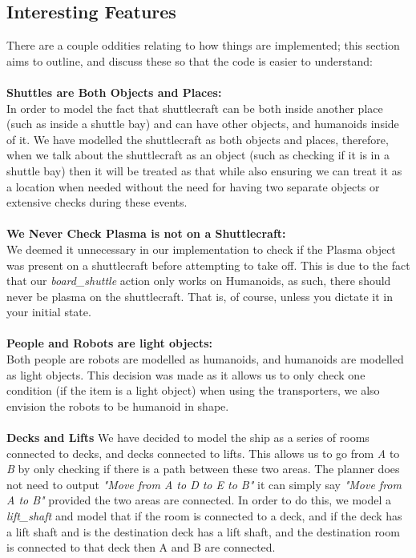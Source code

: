 \documentclass[11pt, oneside]{article}   	%
\begin{document}
\subsection{Interesting Features}
There are a couple oddities relating to how things are implemented; this section aims to outline, and discuss these so that the code is easier to understand:\\ \\ 
\textbf{Shuttles are Both Objects and Places: } \\
In order to model the fact that shuttlecraft can be both inside another place (such as inside a shuttle bay) and can have other objects, and humanoids inside of it. We have modelled the shuttlecraft as both objects and places, therefore, when we talk about the shuttlecraft as an object (such as checking if it is in a shuttle bay) then it will be treated as that while also ensuring we can treat it as a location when needed without the need for having two separate objects or extensive checks during these events.\\ \\
\textbf{We Never Check Plasma is not on a Shuttlecraft: } \\
We deemed it unnecessary in our implementation to check if the Plasma object was present on a shuttlecraft before attempting to take off. This is due to the fact that our \textit{board\_shuttle} action only works on Humanoids, as such, there should never be plasma on the shuttlecraft. That is, of course, unless you dictate it in your initial state. \\ \\
\textbf{People and Robots are light objects:  } \\
Both people are robots are modelled as humanoids, and humanoids are modelled as light objects. This decision was made as it allows us to only check one condition (if the item is a light object) when using the transporters, we also envision the robots to be humanoid in shape. \\ \\
\textbf{Decks and Lifts}
We have decided to model the ship as a series of rooms connected to decks, and decks connected to lifts. This allows us to go from \textit{A} to \textit{B} by only checking if there is a path between these two areas. The planner does not need to output \textit{"Move from A to D to E to B"} it can simply say \textit{"Move from A to B"} provided the two areas are connected. In order to do this, we model a \textit{lift\_shaft} and model that if the room is connected to a deck, and if the deck has a lift shaft and is the destination deck has a lift shaft, and the destination room is connected to that deck then A and B are connected. 
\end{document}
